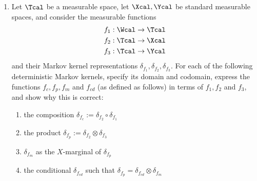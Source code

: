 \begin{enumerate}[label=3.\arabic*]
\begin{ungradedsolution}
\begin{enumerate}
            \begin{align*}
                M(X, A & | Y, C) \circ N(X, B| Y, D)                                                                                   \\
                       & = (F, (y,c,d)) \mapsto \int_{\Xcal\times \Acal}\mathbbm{1}_{F}(x,a)M(dx, da|y, c)N(X\in\Xcal, B\in\Bcal|y, d) \\
                       & = M(X, A|Y,C)
            \end{align*}
            where $F\in\Bcal_{\Xcal\times\Acal}$, and similarly
            $$N(X, B| Y, D) \circ M(X, A| Y, C) = N(X, B| Y, D).$$
            So we require that $M(X, A|Y, C=c) = N(X, B|Y, D=d)$ for all $c\in\Ccal$ and for all $d\in\Dcal$.
        \end{enumerate}
    \end{ungradedsolution}

    \item
    Let $\Tcal$ be a measurable space, let $\Xcal, \Ycal$ be standard measurable spaces, and consider the measurable functions
    \begin{align*}
        f_1 & : \Wcal \rightarrow \Tcal \\
        f_2 & : \Tcal \rightarrow \Xcal \\
        f_3 & : \Tcal \rightarrow \Ycal
    \end{align*}
    and their Markov kernel representations $\delta_{f_1}, \delta_{f_2}, \delta_{f_3}$. For each of the following deterministic Markov kernels, specify its domain and codomain, express the functions $f_c, f_p, f_m$ and $f_{cd}$ (as defined as follows) in terms of $f_1, f_2$ and $f_3$, and show why this is correct:

    \begin{enumerate}
        \item the composition $\delta_{f_c} := \delta_{f_2} \circ \delta_{f_1}$
        \item the product $\delta_{f_p} := \delta_{f_2} \otimes \delta_{f_3}$
        \item $\delta_{f_m}$ as the $X$-marginal of $\delta_{f_p}$
        \item the conditional $\delta_{f_{cd}}$ such that $\delta_{f_p} = \delta_{f_{cd}} \otimes \delta_{f_m}$
    \end{enumerate}


\end{enumerate}

